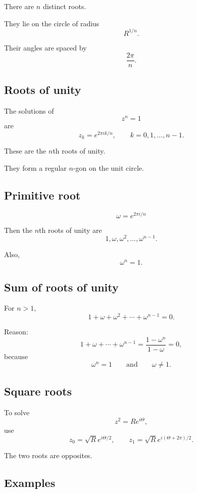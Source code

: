 There are \(n\) distinct roots.

They lie on the circle of radius
\[
    R^{1/n}.
\]

Their angles are spaced by
\[
\boxed{
    \frac{2\pi}{n}.
}
\]

\subsection*{Roots of unity}

The solutions of
\[
    z^n=1
\]
are
\[
\boxed{
    z_k=e^{2\pi i k/n},
    \qquad
    k=0,1,\ldots,n-1.
}
\]

These are the \(n\)th roots of unity.

They form a regular \(n\)-gon on the unit circle.

\subsection*{Primitive root}

\[
\boxed{
    \omega=e^{2\pi i/n}
}
\]

Then the \(n\)th roots of unity are
\[
\boxed{
    1,\omega,\omega^2,\ldots,\omega^{n-1}.
}
\]

Also,
\[
\boxed{
    \omega^n=1.
}
\]

\subsection*{Sum of roots of unity}

For \(n>1\),
\[
\boxed{
    1+\omega+\omega^2+\cdots+\omega^{n-1}=0.
}
\]

Reason:
\[
    1+\omega+\cdots+\omega^{n-1}
    =
    \frac{1-\omega^n}{1-\omega}
    =
    0,
\]
because
\[
    \omega^n=1
    \qquad
    \text{and}
    \qquad
    \omega\ne1.
\]

\subsection*{Square roots}

To solve
\[
    z^2=Re^{i\Theta},
\]
use
\[
\boxed{
    z_0=\sqrt R e^{i\Theta/2},
    \qquad
    z_1=\sqrt R e^{i(\Theta+2\pi)/2}.
}
\]

The two roots are opposites.

\subsection*{Examples}

